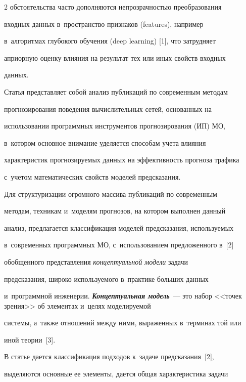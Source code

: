 \begin{multicols}{2}
обстоятельства час\-то дополняются непрозрачностью преобразования 


входных данных в~пространство при\-зна\-ков (features), например 


в~алгоритмах глубокого обуче\-ния (deep learning) [1], что за\-труд\-ня\-ет 


априорную оценку влияния на результат тех или иных свойств входных 


данных. 


  


  Статья представляет собой анализ публикаций по современным методам 


прогнозирования поведения вычислительных сетей, основанных на 


использовании программных инструментов прогнозирования (ИП) МО, 


в~котором основное внимание уделяется способам учета влияния 


характеристик прогнозируемых данных на эффективность прогноза трафика 


с~учетом математических свойств моделей предсказания. 


  


  Для структуризации огромного массива пуб\-ли\-ка\-ций по современным 


методам, техникам и~моделям прогнозов, на котором выполнен данный 


анализ, предлагается классификация моделей \mbox{предсказания}, используемых 


в~современных про\-грам\-мных МО, с~использованием предложенного в~[2] 


обобщенного пред\-став\-ле\-ния \textit{концептуальной модели} задачи 


предсказания, широко ис\-поль\-зу\-емо\-го в~практике больших данных 


и~программной инженерии. {\bfseries\textit{Концептуальная модель}}~--- это набор <<точек зрения>> об элементах и~целях мо\-де\-ли\-ру\-емой 


сис\-те\-мы, а~так\-же отношений между ними, выраженных в~терминах той или 


иной тео\-рии~[3]. 


  


  В статье дается классификация подходов к~задаче предсказания~[2], 


выделяются основные ее элементы, дается общая характеристика задачи 



\end{multicols}
